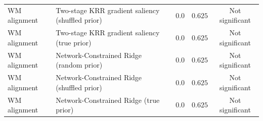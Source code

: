 \begin{table}[t]
\begin{tabular}{llccc}
WM alignment & Two-stage KRR gradient saliency (shuffled prior) & 0.0 & $0.625$ & Not significant \\
WM alignment & Two-stage KRR gradient saliency (true prior) & 0.0 & $0.625$ & Not significant \\
WM alignment & Network-Constrained Ridge (random prior) & 0.0 & $0.625$ & Not significant \\
WM alignment & Network-Constrained Ridge (shuffled prior) & 0.0 & $0.625$ & Not significant \\
WM alignment & Network-Constrained Ridge (true prior) & 0.0 & $0.625$ & Not significant \\
\bottomrule
\end{tabular}
\end{table}
